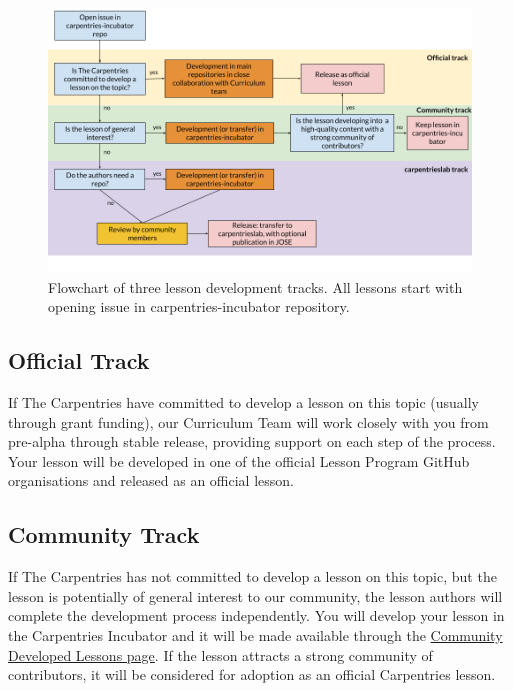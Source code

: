 \documentclass[
]{book}
\begin{document}
\begin{figure}
\centering
\includegraphics{figures/lesson-development-tracks.png}
\caption{Flowchart of three lesson development tracks. All lessons start with opening issue in carpentries-incubator repository.}
\end{figure}

\hypertarget{official-track}{%
\subsection{Official Track}\label{official-track}}

If The Carpentries have committed to develop a lesson
on this topic (usually through grant funding), our
Curriculum Team will work closely with you from
pre-alpha through stable release, providing support on
each step of the process. Your lesson will be
developed in one of the official Lesson Program GitHub
organisations and released as an official lesson.

\hypertarget{community-track}{%
\subsection{Community Track}\label{community-track}}

If The Carpentries has not committed to develop a
lesson on this topic, but the lesson is potentially of
general interest to our community, the lesson authors
will complete the development process independently.
You will develop
your lesson in the Carpentries Incubator and it will be
made available through the \href{https://carpentries.org/community-lessons/}{Community Developed Lessons page}.
If the lesson attracts a strong community
of contributors, it will be considered for adoption
as an official Carpentries lesson.
\end{document}
